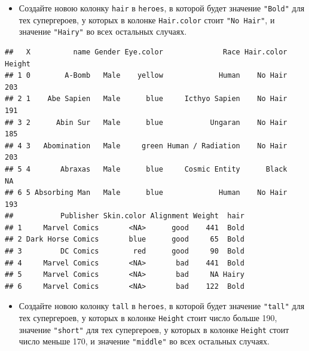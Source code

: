 \documentclass[]{book}
\newenvironment{Shaded}{\begin{snugshade}}{\end{snugshade}}
\newcommand{\KeywordTok}[1]{\textcolor[rgb]{0.13,0.29,0.53}{\textbf{#1}}}
\newcommand{\StringTok}[1]{\textcolor[rgb]{0.31,0.60,0.02}{#1}}
\newcommand{\OperatorTok}[1]{\textcolor[rgb]{0.81,0.36,0.00}{\textbf{#1}}}
\newcommand{\NormalTok}[1]{#1}
\providecommand{\tightlist}{%
  \setlength{\itemsep}{0pt}\setlength{\parskip}{0pt}}
\begin{document}
\begin{itemize}
\tightlist
\item
  Создайте новою колонку \texttt{hair} в \texttt{heroes}, в которой
  будет значение \texttt{"Bold"} для тех супергероев, у которых в
  колонке \texttt{Hair.color} стоит \texttt{"No\ Hair"}, и значение
  \texttt{"Hairy"} во всех остальных случаях.
\end{itemize}

\begin{Shaded}
\end{Shaded}

\begin{verbatim}
##   X          name Gender Eye.color              Race Hair.color Height
## 1 0        A-Bomb   Male    yellow             Human    No Hair    203
## 2 1    Abe Sapien   Male      blue     Icthyo Sapien    No Hair    191
## 3 2      Abin Sur   Male      blue           Ungaran    No Hair    185
## 4 3   Abomination   Male     green Human / Radiation    No Hair    203
## 5 4       Abraxas   Male      blue     Cosmic Entity      Black     NA
## 6 5 Absorbing Man   Male      blue             Human    No Hair    193
##           Publisher Skin.color Alignment Weight  hair
## 1     Marvel Comics       <NA>      good    441  Bold
## 2 Dark Horse Comics       blue      good     65  Bold
## 3         DC Comics        red      good     90  Bold
## 4     Marvel Comics       <NA>       bad    441  Bold
## 5     Marvel Comics       <NA>       bad     NA Hairy
## 6     Marvel Comics       <NA>       bad    122  Bold
\end{verbatim}

\begin{itemize}
\tightlist
\item
  Создайте новою колонку \texttt{tall} в \texttt{heroes}, в которой
  будет значение \texttt{"tall"} для тех супергероев, у которых в
  колонке \texttt{Height} стоит число больше 190, значение
  \texttt{"short"} для тех супергероев, у которых в колонке
  \texttt{Height} стоит число меньше 170, и значение \texttt{"middle"}
  во всех остальных случаях.
\end{itemize}
\end{document}

